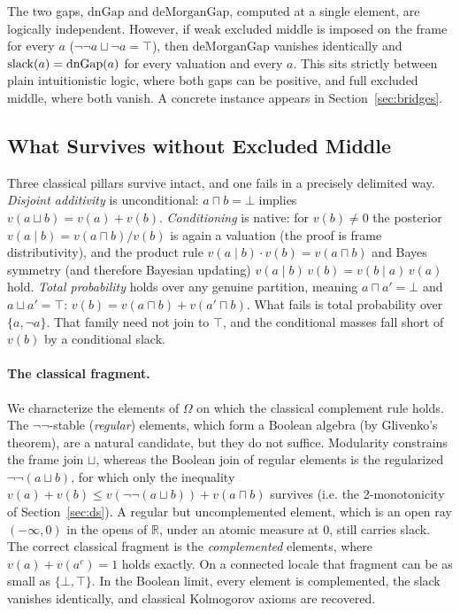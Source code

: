 \begin{remark}
The two gaps, $\mathrm{dnGap}$ and $\mathrm{deMorganGap}$, computed 
at a single element, are logically independent.
However, if
weak excluded middle is imposed on the frame for every $a$
($\neg\neg a \sqcup \neg a = \top$), then
$\mathrm{deMorganGap}$ vanishes identically and
$\mathrm{slack}(a) = \mathrm{dnGap}(a)$ for every valuation and every $a$.
This sits strictly between plain intuitionistic logic, where both
gaps can be positive, and full excluded middle, where both vanish.
A concrete instance appears in Section~\ref{sec:bridges}.
\end{remark}

\subsection{What Survives without Excluded Middle}

Three classical pillars survive intact, and one fails in a precisely
delimited way.  \emph{Disjoint additivity} is unconditional:
$a \sqcap b = \bot$ implies $v(a \sqcup b) = v(a) + v(b)$.
\emph{Conditioning} is native: for $v(b) \neq 0$ the posterior
$v(a \mid b) = v(a \sqcap b)/v(b)$ is again a valuation (the proof is
frame distributivity), and the product rule
$v(a \mid b) \cdot v(b) = v(a \sqcap b)$ and Bayes symmetry
(and therefore Bayesian updating)
$v(a \mid b)\,v(b) = v(b \mid a)\,v(a)$ hold.  \emph{Total
probability} holds over any genuine partition, meaning
$a \sqcap a' = \bot$ and $a \sqcup a' = \top$:
$v(b) = v(a \sqcap b) + v(a' \sqcap b)$.  What fails is total
probability over $\{a, \neg a\}$.  That family need not join to
$\top$, and the conditional masses fall short of $v(b)$ by a
conditional slack.

\paragraph{The classical fragment.}
We characterize the elements of $\Omega$ on which the classical
complement rule holds.  The $\neg\neg$-stable (\emph{regular})
elements, which form a Boolean algebra (by Glivenko's theorem), are a
natural candidate, but they do not suffice. Modularity constrains
the frame join $\sqcup$, whereas the Boolean join of regular
elements is the regularized $\neg\neg(a \sqcup b)$, for which
only the inequality
$v(a) + v(b) \le v(\neg\neg(a \sqcup b)) + v(a \sqcap b)$ survives
(i.e. the 2-monotonicity of Section~\ref{sec:ds}).  A regular but uncomplemented
element, which is an open ray $(-\infty,0)$ in the opens of $\mathbb{R}$,
under an atomic measure at $0$, still carries slack.  The correct
classical fragment is the \emph{complemented} elements, where
$v(a) + v(a^{c}) = 1$ holds exactly.  On a connected
locale that fragment can be as small as $\{\bot, \top\}$.  In the
Boolean limit, every element is complemented, the slack vanishes
identically, and classical Kolmogorov axioms are recovered.

